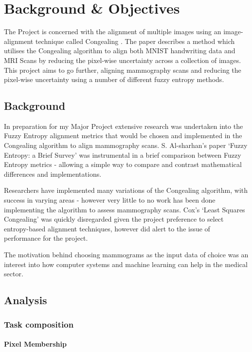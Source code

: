 \chapter{Background \& Objectives}

The Project is concerned with the alignment of multiple images using an image-alignment technique called Congealing \cite{joint-alignment}. The paper describes a method which utilises the Congealing algorithm to align both MNIST handwriting data and MRI Scans by reducing the pixel-wise uncertainty across a collection of images. This project aims to go further, aligning mammography scans and reducing the pixel-wise uncertainty using a number of different fuzzy entropy methods.

\section{Background}
In preparation for my Major Project extensive research was undertaken into the Fuzzy Entropy alignment metrics that would be chosen and implemented in the Congealing algorithm to align mammography scans. S. Al-sharhan's paper `Fuzzy Entropy: a Brief Survey' \cite{Al-Sharhan_Karray_Gueaieb_Basir_2001} was instrumental in a brief comparison between Fuzzy Entropy metrics - allowing a simple way to compare and contrast mathematical differences and implementations.

Researchers have implemented many variations of the Congealing algorithm, with success in varying areas - however very little to no work has been done implementing the algorithm to assess mammography scans. Cox's `Least Squares Congealing' \cite{Cox_Sridharan_Lucey_Cohn_2008} was quickly disregarded given the project preference to select entropy-based alignment techniques, however did alert to the issue of performance for the project.

The motivation behind choosing mammograms as the input data of choice was an interest into how computer systems and machine learning can help in the medical sector.

\section{Analysis}

\subsection{Task composition}

\subsubsection{Pixel Membership}

